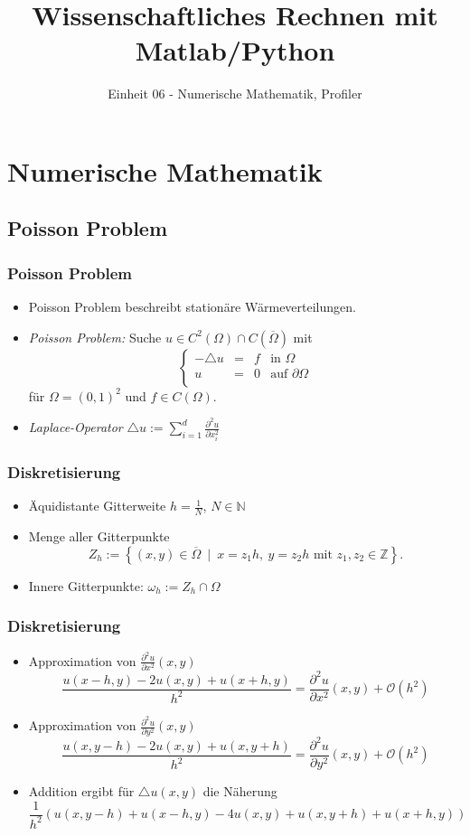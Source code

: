 \documentclass[hyperref={xetex}]{beamer}
\title{Wissenschaftliches Rechnen mit Matlab/Python}
\subtitle{Einheit 06 - Numerische Mathematik, Profiler}
\begin{document}
\titlepage

\section{Numerische Mathematik}

\subsection{Poisson Problem}
%
% 
\begin{frame}[fragile]\frametitle{Poisson Problem}
\begin{itemize}
\item Poisson Problem beschreibt station\"are W\"armeverteilungen.
\item {\it Poisson Problem:} Suche  $u \in
C^2(\Omega)\cap C(\overline{\Omega})$ mit
\[
\left \{ \begin{array}{rcll}
- \triangle u & = & f & \mbox{in } \Omega\\
u & = & 0 & \mbox{auf } \partial \Omega\\ 
\end{array} \right.
\]
f\"ur $\Omega=(0,1)^2$ und $f \in C(\Omega)$.
\item  {\it Laplace-Operator} 
$ \triangle u := \sum_{i=1}^d \frac{\partial ^2 u}{\partial x_i^2} $
\end{itemize}
\end{frame}
%
% 
\begin{frame}[fragile]\frametitle{Diskretisierung}
\begin{itemize}
\item \"Aquidistante Gitterweite $h= \frac 1 N$,
$N \in \mathbb{N}$
\item Menge aller Gitterpunkte 
\[ Z_h := \left\{ (x,y) \in \overline{\Omega} \ \mid \ x=z_1h, \ y=z_2h \text{ mit }
z_1,z_2 \in \mathbb{Z} \right\}. \]
\item Innere Gitterpunkte: $\omega_h := Z_h \cap \Omega$
\end{itemize}
\end{frame}
%
% 
\begin{frame}[fragile]\frametitle{Diskretisierung}
\begin{itemize}
\item Approximation von $ \frac{\partial ^2 u}{\partial
  x^2} (x,y)$
{\small \[ \frac{u(x -h,y) - 2 u(x,y) + u(x+h,y)}{h^2} = \frac{\partial ^2 u}{\partial
  x^2} (x,y) + \mathcal{O}(h^2) \]}
\item  Approximation von $ \frac{\partial ^2 u}{\partial
  y^2} (x,y)$
{\small \[ \frac{u(x ,y-h) - 2 u(x,y) + u(x,y+h)}{h^2} = \frac{\partial ^2 u}{\partial
  y^2} (x,y) + \mathcal{O}(h^2) \]}
\item Addition ergibt f\"ur $ \triangle u(x,y)$ die N\"aherung
{\footnotesize \[
 \frac{1}{h^2} \left( u(x,y-h) + u(x-h,y) - 4 u(x,y) + u(x,y+h) +
 u(x+h,y)  \right) 
\] }
\end{itemize}
\end{frame}
\end{document}
